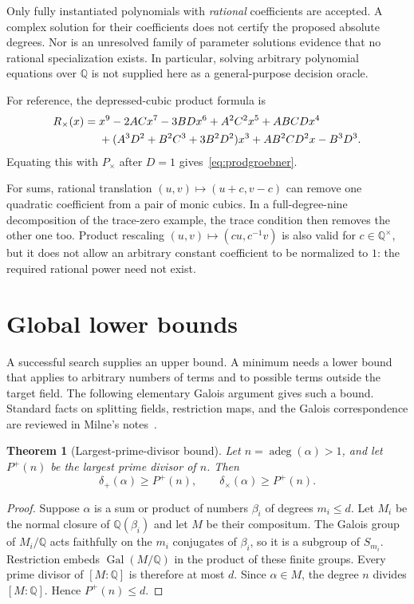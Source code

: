 \documentclass[11pt,letterpaper]{article}
\newtheorem{theorem}{Theorem}[section]
\theoremstyle{definition}\newtheorem{definition}[theorem]{Definition}
\theoremstyle{remark}\newtheorem{remark}[theorem]{Remark}
\newcommand{\Q}{\mathbb Q}
\newcommand{\Gal}{\operatorname{Gal}}
\newcommand{\ad}{\operatorname{adeg}}
\newcommand{\ds}{\delta_{+}}
\newcommand{\dm}{\delta_{\times}}
\begin{document}
Only fully instantiated polynomials with \emph{rational} coefficients are accepted. A complex solution for their coefficients does not certify the proposed absolute degrees. Nor is an unresolved family of parameter solutions evidence that no rational specialization exists. In particular, solving arbitrary polynomial equations over $\Q$ is not supplied here as a general-purpose decision oracle.

For reference, the depressed-cubic product formula is
\begin{align}
 R_\times(x)={}&x^9-2ACx^7-3BDx^6+A^2C^2x^5+ABCDx^4\notag\\
 &+(A^3D^2+B^2C^3+3B^2D^2)x^3
   +AB^2CD^2x-B^3D^3.\label{eq:cubicprodformula}
\end{align}
Equating this with $P_\times$ after $D=1$ gives~\eqref{eq:prodgroebner}.

For sums, rational translation $(u,v)\mapsto(u+c,v-c)$ can remove one quadratic coefficient from a pair of monic cubics. In a full-degree-nine decomposition of the trace-zero example, the trace condition then removes the other one too. Product rescaling $(u,v)\mapsto(cu,c^{-1}v)$ is also valid for $c\in\Q^\times$, but it does not allow an arbitrary constant coefficient to be normalized to $1$: the required rational power need not exist.

\section{Global lower bounds}
\label{sec:bounds}
A successful search supplies an upper bound. A minimum needs a lower bound that applies to arbitrary numbers of terms and to possible terms outside the target field. The following elementary Galois argument gives such a bound. Standard facts on splitting fields, restriction maps, and the Galois correspondence are reviewed in Milne's notes~\cite{milne}.

\begin{theorem}[Largest-prime-divisor bound]
Let $n=\ad(\alpha)>1$, and let $P^+(n)$ be the largest prime divisor of $n$. Then
\begin{equation}
 \ds(\alpha)\ge P^+(n),\qquad \dm(\alpha)\ge P^+(n).
 \label{eq:primebound}
\end{equation}
\end{theorem}
\begin{proof}
Suppose $\alpha$ is a sum or product of numbers $\beta_i$ of degrees $m_i\le d$. Let $M_i$ be the normal closure of $\Q(\beta_i)$ and let $M$ be their compositum. The Galois group of $M_i/\Q$ acts faithfully on the $m_i$ conjugates of $\beta_i$, so it is a subgroup of $S_{m_i}$. Restriction embeds $\Gal(M/\Q)$ in the product of these finite groups. Every prime divisor of $[M:\Q]$ is therefore at most $d$. Since $\alpha\in M$, the degree $n$ divides $[M:\Q]$. Hence $P^+(n)\le d$.
\end{proof}
\end{document}
